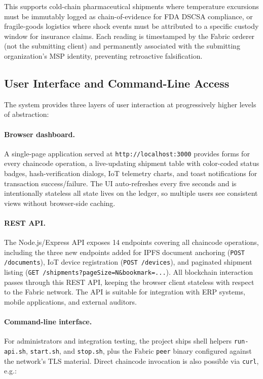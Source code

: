 \documentclass[conference]{IEEEtran}
\begin{document}
This supports cold-chain pharmaceutical shipments where temperature
excursions must be immutably logged as chain-of-evidence for FDA DSCSA
compliance, or fragile-goods logistics where shock events must be attributed
to a specific custody window for insurance claims.  Each reading is
timestamped by the Fabric orderer (not the submitting client) and permanently
associated with the submitting organization's MSP identity, preventing
retroactive falsification.

\subsection{User Interface and Command-Line Access}

The system provides three layers of user interaction at progressively
higher levels of abstraction:

\paragraph{Browser dashboard.}  A single-page application served at
\texttt{http://localhost:3000} provides forms for every chaincode
operation, a live-updating shipment table with color-coded status badges,
hash-verification dialogs, IoT telemetry charts, and toast notifications
for transaction success/failure.  The UI auto-refreshes every five
seconds and is intentionally stateless  all state lives on the ledger,
so multiple users see consistent views without browser-side caching.

\paragraph{REST API.}  The Node.js/Express API exposes 14 endpoints
covering all chaincode operations, including the three new endpoints
added for IPFS document anchoring (\texttt{POST /documents}), IoT device
registration (\texttt{POST /devices}), and paginated shipment listing
(\texttt{GET /shipments?pageSize=N\&bookmark=...}).  All blockchain
interaction passes through this REST API, keeping the browser client
stateless with respect to the Fabric network.  The API is suitable for
integration with ERP systems, mobile applications, and external
auditors.

\paragraph{Command-line interface.}  For administrators and integration
testing, the project ships shell helpers \texttt{run-api.sh},
\texttt{start.sh}, and \texttt{stop.sh}, plus the Fabric \texttt{peer}
binary configured against the network's TLS material.  Direct chaincode
invocation is also possible via \texttt{curl}, e.g.:
\end{document}
